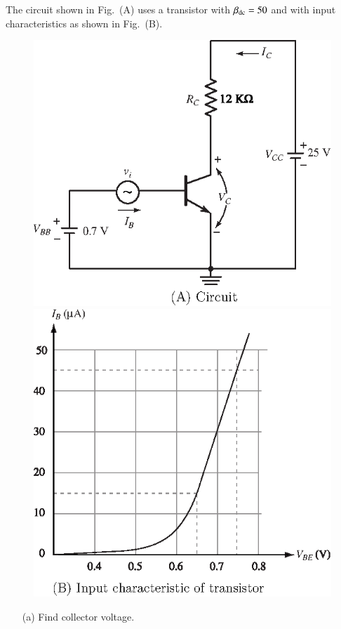 \begin{example}\label{exam3.12}
The circuit shown in Fig.~(A) uses a transistor with $\beta_{\operatorname{dc}}=50$ and with input characteristics as shown in Fig.~(B).
\begin{figure}[H]
\centering
\includegraphics{chap2/S3-EE-03-016a.eps}

\smallskip
\includegraphics{chap2/S3-EE-03-016b.eps}
\end{figure}
\begin{itemize}
\item[(a)] Find collector voltage.


\end{itemize}
\end{example}
